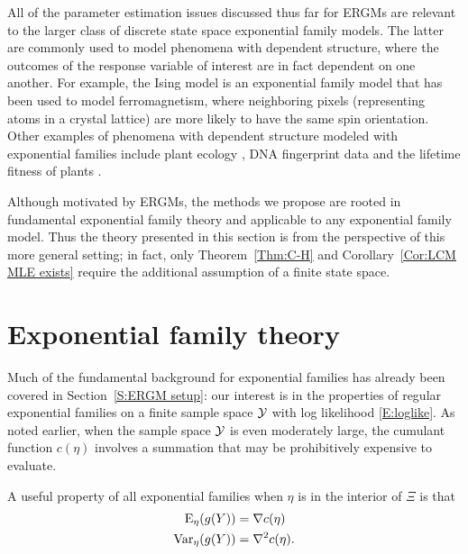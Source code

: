 All of the parameter estimation issues discussed thus far for ERGMs are relevant to 
the larger class of discrete state space exponential family models.
The latter are commonly used to model phenomena with dependent structure, 
where the outcomes of the response variable of interest are in fact dependent on one 
another.  For example, the Ising 
model \citep{Ising,Potts} is an exponential family model that has been used to model 
ferromagnetism, where neighboring 
pixels (representing atoms in a crystal lattice) are more likely to have the same 
spin orientation.  
Other examples of phenomena with dependent structure modeled with exponential 
families include
plant ecology \citep*{Besag:1974,Besag:1975}, DNA fingerprint data \citep{Geyer:1992}
 and the lifetime fitness of plants \citep*{Shaw:2008}.

Although motivated by ERGMs, the methods we propose are rooted in fundamental
exponential family theory and applicable to any 
exponential family model.  Thus the theory presented in this section is from
the perspective of this more general setting; in fact, only Theorem~\ref{Thm:C-H} and
Corollary~\ref{Cor:LCM MLE exists} require 
the additional assumption of a finite state space.

\section{Exponential family theory} \label{S:Expfam theory}
Much of the fundamental background for exponential families has already been
covered in Section~\ref{S:ERGM setup}: our interest is in the properties of
 regular exponential
families on a finite sample space ${\mathcal Y}$  with log likelihood \eqref{E:loglike}.
As noted earlier, when the sample space ${\mathcal Y}$ is even moderately large,
the cumulant function $c(\eta)$ involves a summation that may be prohibitively 
expensive to evaluate.  

A useful property of all exponential families \cite[p.~27]{TPE2} when 
$\eta$ is in the interior of $\Xi$ is that 
\begin{align*}
	\operatorname{E}_\eta(g(Y)) &= \nabla c(\eta)	\\
	\operatorname{Var}_\eta(g(Y)) &= \nabla^2 c( \eta ).
\end{align*}

